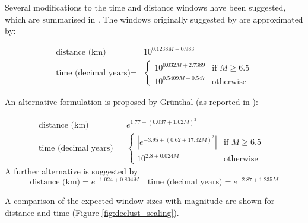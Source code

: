 Several modifications to the time and distance windows have been 
suggested, which are summarised in \cite{vanStiphout2012}. The windows 
originally suggested by \cite{GardnerKnopoff1974} are approximated by:

\begin{equation}\begin{split} 
\mbox{distance (km)} = &10^{0.1238 M + 0.983}\\
\mbox{time (decimal years)} = & 
\begin{cases} 10^{0.032 M + 2.7389} & \text{if $M \geq 6.5$} \\ 
              10^{0.5409 M - 0.547} & \mbox{otherwise}  \end{cases}\end{split}
\end{equation}

An alternative formulation is proposed by Gr\"unthal (as reported in \cite{vanStiphout2012}):

\begin{equation}\begin{split} 
\mbox{distance (km)} = & e^{1.77 + \left( {0.037 + 1.02 M} \right)^2} \\ 
   \mbox{time (decimal years)} = & \begin{cases}   |e^{-3.95+ \left( {0.62 + 17.32 M}
    \right)^2}|    & \text{if $M \geq 6.5$ } \\ 10^{2.8 + 0.024 M} & 
    \text{otherwise}  \end{cases}\end{split}
\end{equation}
A further alternative is suggested by \cite{Uhrhammer1986}
%
\begin{equation}
\mbox{distance (km)} = e^{-1.024 + 0.804 M} \quad \mbox{time (decimal years)} = 
    e^{-2.87 + 1.235 M}
\end{equation}

A comparison of the expected window sizes with magnitude are shown for 
distance  and time (Figure \ref{fig:declust_scaling}).


